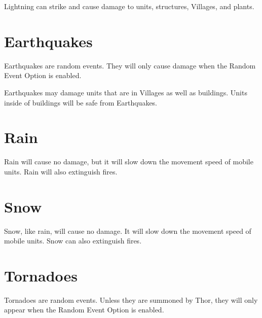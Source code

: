 Lightning can strike and cause damage to units, structures, Villages, and plants.

\section{Earthquakes}


Earthquakes are random events. They will only cause damage when the Random Event Option is enabled.

Earthquakes may damage units that are in Villages as well as buildings. Units inside of buildings will be safe from Earthquakes.

\section{Rain}


Rain will cause no damage, but it will slow down the movement speed of mobile units. Rain will also extinguish fires.

\section{Snow}


Snow, like rain, will cause no damage. It will slow down the movement speed of mobile units. Snow can also extinguish fires.

\section{Tornadoes}


Tornadoes are random events. Unless they are summoned by Thor, they will only appear when the Random Event Option is enabled.
